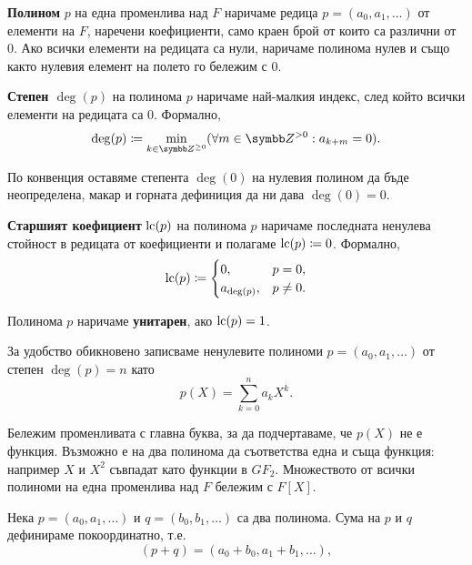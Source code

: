 \documentclass[numbers=endperiod, bibliography=totocnumbered]{scrartcl}
\begin{document}
\begin{definition}
  \textbf{Полином} \( p \) на една променлива над \( F \) наричаме редица \( p = (a_0, a_1, \ldots) \) от елементи на \( F \), наречени коефициенти, само краен брой от които са различни от \( 0 \). Ако всички елементи на редицата са нули, наричаме полинома нулев и също както нулевия елемент на полето го бележим с \( 0 \).

  \textbf{Степен \( \deg(p) \)} на полинома \( p \) наричаме най-малкия индекс, след който всички елементи на редицата са \( 0 \). Формално,
  \begin{equation*}
    \deg(p) \coloneqq \min_{k \in \ZNNeg} (\forall m \in \ZPos : a_{k + m} = 0).
  \end{equation*}

  По конвенция оставяме степента \( \deg(0) \) на нулевия полином да бъде неопределена, макар и горната дефиниция да ни дава \( \deg(0) = 0 \).

  \textbf{Старшият коефициент} \( \operatorname{lc}(p) \) на полинома \( p \) наричаме последната ненулева стойност в редицата от коефициенти и полагаме \( \operatorname{lc}(p) \coloneqq 0 \). Формално,
  \begin{align*}
    \operatorname{lc}(p) \coloneqq
    \begin{cases}
      0, &p = 0, \\
      a_{\deg(p)}, &p \neq 0.
    \end{cases}
  \end{align*}

  Полинома \( p \) наричаме \textbf{унитарен}, ако \( \operatorname{lc}(p) = 1 \).
\end{definition}

За удобство обикновено записваме ненулевите полиноми \( p = (a_0, a_1, \ldots) \) от степен \( \deg(p) = n \) като
\begin{equation*}
  p(X) = \sum_{k=0}^n a_k X^k.
\end{equation*}

Бележим променливата с главна буква, за да подчертаваме, че \( p(X) \) не е функция. Възможно е на два полинома да съответства една и съща функция: например \( X \) и \( X^2 \) съвпадат като функции в \( GF_2 \). Множеството от всички полиноми на една променлива над \( F \) бележим с \( F[X] \).

Нека \( p = (a_0, a_1, \ldots) \) и \( q = (b_0, b_1, \ldots) \) са два полинома. Сума на \( p \) и \( q \) дефинираме покоординатно, т.е.
\begin{equation*}
  (p + q) = (a_0 + b_0, a_1 + b_1, \ldots),
\end{equation*}
\end{document}
